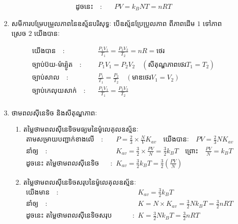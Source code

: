 \documentclass[12pt, a4paper]{article}
\begin{document}
\begin{enumerate}[I]
\begin{enumerate}[m]
\begin{align*}
		\text{ដូចនេះ}\quad :&\quad PV=k_{B}NT=nRT
	\end{align*}
	\item {\kml សមីការបម្រែបម្រួលភាពនៃឧស្ម័នបរិសុទ្ធៈ} បើឧស្ម័នប្រែប្រួលភាព ពីភាពដើម $1$ ទៅភាពស្រេច $2$ យើងបានៈ
	\begin{itemize}
	\end{itemize}
	\begin{align*}
		\text{យើងបាន}\quad :&\quad \frac{P_1V_1}{T_1}=\frac{P_2V_2}{T_2}=nR=\text{ថេរ}\\
		\text{ច្បាប់ប៊យ-ម៉ារ្យ៉ូត}\quad :&\quad P_{1}V_{1}=P_{2}V_{2}\quad \left(\text{សីតុណ្ហភាពថេរ} T_{1}=T_{2}\right)\\
		\text{ច្បាប់សាល}\quad :&\quad \frac{P_1}{T_1}=\frac{P_2}{T_2}\quad \left(\text{មាឌថេរ} V_{1}=V_{2}\right)\\
		\text{ច្បាប់កេលុយសាក់}\quad :&\quad \frac{P_1V_1}{T_1}=\frac{P_2V_2}{T_2}\\
	\end{align*}
	\item {\kml ថាមពលសុីនេទិច និងសីតុណ្ហភាពៈ}
		\begin{enumerate}[k]
			\item {\kml តម្លៃថាមពលសុីនេទិចមធ្យមនៃម៉ូលេគុលឧស្ម័នៈ}
			\begin{align*}
			\text{តាមសម្រាយបញ្ជាក់ខាងលើ}\quad :&\quad P=\frac{2}{3}\times\frac{N}{V}K_{av}\quad \text{យើងបានៈ}\quad PV=\frac{2}{3}NK_{av}\\
			\text{នាំឲ្យ}\quad :&\quad K_{av}=\frac{3}{2}\times\frac{PV}{N}=\frac{3}{2}k_{B}T \quad\text{ព្រោះ}\quad \frac{PV}{N}=k_{B}T\\
			\text{ដូចនេះ តម្លៃថាមពលសុីនេទិចមធ្យមនៃម៉ូលេគុលឧស្ម័នគឺៈ}\quad :& \quad K_{av}=\frac{3}{2}k_{B}T=\frac{3}{2}\left(\frac{PV}{N}\right)
			\end{align*}
			\item {\kml តម្លៃថាមពលសុីនេទិចសរុបនៃម៉ូលេគុលឧស្ម័នៈ}
			\begin{align*}
				\text{យើងមាន}\quad :&\quad K_{av}=\frac{3}{2}k_{B}T\\
				\text{នាំឲ្យ}\quad :&\quad K=N\times K_{av}=\frac{3}{2}Nk_{B}T=\frac{3}{2}nRT\\
				\text{ដូចនេះ តម្លៃថាមពលសុីនេទិចសរុបនៃម៉ូលេគុលឧស្ម័នគឺៈ}\quad :& \quad K=\frac{3}{2}Nk_{B}T=\frac{3}{2}nRT

\end{align*}
\end{enumerate}
\end{enumerate}
\end{enumerate}
\end{document}
